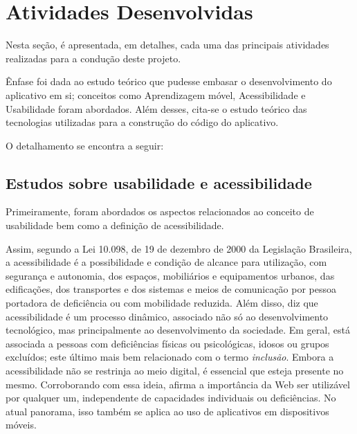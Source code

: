 \chapter{Atividades Desenvolvidas}\label{sec:ativ_desenvolvidas}
Nesta seção, é apresentada, em detalhes, cada uma das principais atividades realizadas para a condução deste projeto.

Ênfase foi dada ao estudo teórico que pudesse embasar o desenvolvimento do aplicativo em si; conceitos como Aprendizagem móvel, Acessibilidade e Usabilidade foram abordados. Além desses, cita-se o estudo teórico das tecnologias utilizadas para a construção do código do aplicativo.

O detalhamento se encontra a seguir:

\section{Estudos sobre usabilidade e acessibilidade}\label{sec:estudos_usab_acess} 



Primeiramente, foram abordados os aspectos relacionados ao conceito de usabilidade bem como a definição de acessibilidade. 

Assim, segundo a Lei 10.098, de 19 de dezembro de 2000 da Legislação Brasileira, a acessibilidade é a possibilidade e condição de alcance para utilização, com segurança e autonomia, dos
espaços, mobiliários e equipamentos urbanos, das
edificações, dos transportes e dos sistemas e meios de comunicação por pessoa portadora de deficiência ou com mobilidade reduzida. Além disso, \cite{torres2002acessibilidade} diz que acessibilidade é um processo dinâmico, associado não só ao desenvolvimento tecnológico, mas principalmente ao desenvolvimento da sociedade. Em geral, está associada a pessoas com deficiências físicas ou psicológicas, idosos ou grupos excluídos; este último mais bem relacionado com o termo \textit{inclusão}. Embora a acessibilidade não se restrinja ao meio digital, é essencial que esteja presente no mesmo. Corroborando com essa ideia, \cite{leew3c} afirma a importância da Web ser utilizável por qualquer um, independente de capacidades individuais ou deficiências. No atual panorama, isso também se aplica ao uso de aplicativos em dispositivos móveis. 

